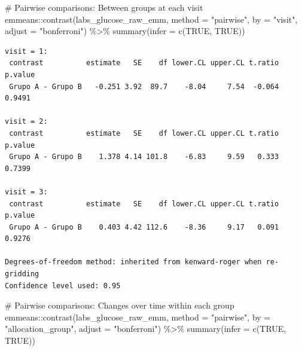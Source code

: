 \documentclass[
  letterpaper,
  DIV=11,
  numbers=noendperiod]{scrartcl}
\newenvironment{Shaded}{\begin{snugshade}}{\end{snugshade}}
\newcommand{\AttributeTok}[1]{\textcolor[rgb]{0.40,0.45,0.13}{#1}}
\newcommand{\CommentTok}[1]{\textcolor[rgb]{0.37,0.37,0.37}{#1}}
\newcommand{\ConstantTok}[1]{\textcolor[rgb]{0.56,0.35,0.01}{#1}}
\newcommand{\FunctionTok}[1]{\textcolor[rgb]{0.28,0.35,0.67}{#1}}
\newcommand{\NormalTok}[1]{\textcolor[rgb]{0.00,0.23,0.31}{#1}}
\newcommand{\SpecialCharTok}[1]{\textcolor[rgb]{0.37,0.37,0.37}{#1}}
\newcommand{\StringTok}[1]{\textcolor[rgb]{0.13,0.47,0.30}{#1}}
\begin{document}
\begin{Shaded}
\begin{Highlighting}[]
\CommentTok{\# Pairwise comparisons: Between groups at each visit}
\NormalTok{emmeans}\SpecialCharTok{::}\FunctionTok{contrast}\NormalTok{(labs\_glucose\_raw\_emm, }\AttributeTok{method =} \StringTok{"pairwise"}\NormalTok{, }\AttributeTok{by =} \StringTok{"visit"}\NormalTok{, }\AttributeTok{adjust =} \StringTok{"bonferroni"}\NormalTok{) }\SpecialCharTok{\%\textgreater{}\%} \FunctionTok{summary}\NormalTok{(}\AttributeTok{infer =} \FunctionTok{c}\NormalTok{(}\ConstantTok{TRUE}\NormalTok{, }\ConstantTok{TRUE}\NormalTok{))}
\end{Highlighting}
\end{Shaded}

\begin{verbatim}
visit = 1:
 contrast          estimate   SE    df lower.CL upper.CL t.ratio p.value
 Grupo A - Grupo B   -0.251 3.92  89.7    -8.04     7.54  -0.064  0.9491

visit = 2:
 contrast          estimate   SE    df lower.CL upper.CL t.ratio p.value
 Grupo A - Grupo B    1.378 4.14 101.8    -6.83     9.59   0.333  0.7399

visit = 3:
 contrast          estimate   SE    df lower.CL upper.CL t.ratio p.value
 Grupo A - Grupo B    0.403 4.42 112.6    -8.36     9.17   0.091  0.9276

Degrees-of-freedom method: inherited from kenward-roger when re-gridding 
Confidence level used: 0.95 
\end{verbatim}

\begin{Shaded}
\begin{Highlighting}[]
\CommentTok{\# Pairwise comparisons: Changes over time within each group}
\NormalTok{emmeans}\SpecialCharTok{::}\FunctionTok{contrast}\NormalTok{(labs\_glucose\_raw\_emm, }\AttributeTok{method =} \StringTok{"pairwise"}\NormalTok{, }\AttributeTok{by =} \StringTok{"allocation\_group"}\NormalTok{, }\AttributeTok{adjust =} \StringTok{"bonferroni"}\NormalTok{) }\SpecialCharTok{\%\textgreater{}\%} \FunctionTok{summary}\NormalTok{(}\AttributeTok{infer =} \FunctionTok{c}\NormalTok{(}\ConstantTok{TRUE}\NormalTok{, }\ConstantTok{TRUE}\NormalTok{))}
\end{Highlighting}
\end{Shaded}
\end{document}
